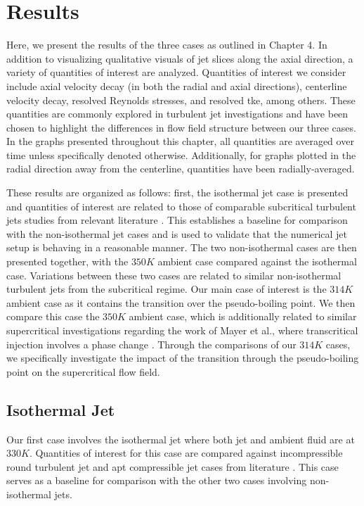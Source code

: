 \chapter{Results}
Here, we present the results of the three cases as outlined in Chapter 4. In addition to visualizing qualitative visuals of jet slices along the axial direction, a variety of quantities of interest are analyzed. Quantities of interest we consider include axial velocity decay (in both the radial and axial directions), centerline velocity decay, resolved Reynolds stresses, and resolved \gls{tke}, among others. These quantities are commonly explored in turbulent jet investigations and have been chosen to highlight the differences in flow field structure between our three cases. In the graphs presented throughout this chapter, all quantities are averaged over time unless specifically denoted otherwise. Additionally, for graphs plotted in the radial direction away from the centerline, quantities have been radially-averaged. 

These results are organized as follows: first, the isothermal jet case is presented and quantities of interest are related to those of comparable subcritical turbulent jets studies from relevant literature \cite{}. This establishes a baseline for comparison with the non-isothermal jet cases and is used to validate that the numerical jet setup is behaving in a reasonable manner. The two non-isothermal cases are then presented together, with the $350 K$ ambient case compared against the isothermal case. Variations between these two cases are related to similar non-isothermal turbulent jets from the subcritical regime. Our main case of interest is the $314 K$ ambient case as it contains the transition over the pseudo-boiling point. We then compare this case the $350 K$ ambient case, which is additionally related to similar supercritical investigations regarding the work of Mayer et al., where transcritical injection involves a phase change \cite{}. Through the comparisons of our $314 K$  cases, we specifically investigate the impact of the transition through the pseudo-boiling point on the supercritical flow field. 


\section{Isothermal Jet}
Our first case involves the isothermal jet where both jet and ambient fluid are at $330 K$. Quantities of interest for this case are compared against incompressible round turbulent jet \cite{Pope} and apt compressible jet cases from literature \cite{iso_comp_1, iso_comp_1_ref_1, iso_comp_2}. This case serves as a baseline for comparison with the other two cases involving non-isothermal jets. 

